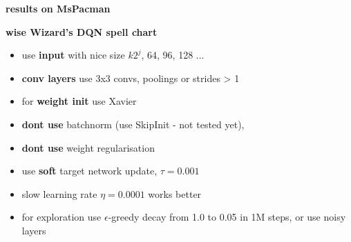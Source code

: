 \documentclass[xcolor=dvipsnames]{beamer}
\begin{document}
\begin{frame}{\bf results on MsPacman}


\end{frame}


\begin{frame}{\bf wise Wizard's DQN spell chart}
  \begin{itemize}
    \item use {\bf \color{red} input} with nice size $k2^j$, 64, 96, 128 ...
    \item {\bf \color{red} conv layers} use 3x3 convs, poolings or strides > 1
    \item for {\bf \color{red} weight init} use Xavier
    \item {\bf \color{red} dont use} batchnorm (use SkipInit - not tested yet),
    \item {\bf \color{red} dont use} weight regularisation
    \item use {\bf \color{red} soft} target network update, $\tau = 0.001$
    \item slow learning rate $\eta = 0.0001$ works better
    \item for exploration use $\epsilon$-greedy decay from 1.0 to 0.05 in 1M steps, or use noisy layers
  \end{itemize}
\end{frame}
\end{document}
